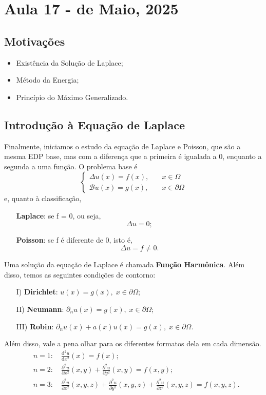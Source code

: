 \documentclass[../pde_notes.tex]{subfiles}
\begin{document}
\section{Aula 17 - de Maio, 2025}
\subsection{Motivações}
\begin{itemize}
	\item Existência da Solução de Laplace;
	\item Método da Energia;
	\item Princípio do Máximo Generalizado.
\end{itemize}
\subsection{Introdução à Equação de Laplace}
Finalmente, iniciamos o estudo da equação de Laplace e Poisson, que são a mesma EDP base, mas com a diferença que a primeira é igualada a 0, enquanto a segunda a uma função. O problema base é
\[
	\left\{\begin{array}{ll}
		\Delta u(x) = f(x),     & \quad x\in \Omega          \\
		\mathcal{B}u(x) = g(x), & \quad x\in \partial \Omega
	\end{array}\right.
\]
e, quanto à classificação,
\begin{itemize}
	\item[\textbf{Laplace}:] se f = 0, ou seja,
	      \[
		      \Delta u = 0;
	      \]
	\item[\textbf{Poisson}:] se f é diferente de 0, isto é,
	      \[
		      \Delta u = f\neq 0.
	      \]
\end{itemize}
Uma solução da equação de Laplace é chamada \textbf{Função Harmônica}. Além disso, temos as seguintes condições de contorno:
\begin{itemize}
	\item[I)] \textbf{Dirichlet}: \(u(x) = g(x),\; x\in \partial \Omega \);
	\item[II)] \textbf{Neumann}: \(\partial_{n}u(x) = g(x), \; x\in \partial \Omega \);
	\item[III)] \textbf{Robin}: \(\partial_{n}u(x) + a(x)u(x) = g(x), \; x\in \partial \Omega \).
\end{itemize}
Além disso, vale a pena olhar para os diferentes formatos dela em cada dimensão.
\begin{align*}
	 & n=1:\quad \frac{\mathrm{d}^{2}u}{\mathrm{d}x^{2}}(x) = f(x);                                                                                                          \\
	 & n=2:\quad \frac{\partial^{2}u}{\partial x^{2}}(x,y) + \frac{\partial^{2}u}{\partial y^{2}}(x,y) = f(x,y);                                                             \\
	 & n=3:\quad \frac{\partial^{2}u}{\partial x^{2}}(x, y, z) + \frac{\partial^{2}u}{\partial y^{2}}(x, y, z) + \frac{\partial^{2}u}{\partial z^{2}}(x, y, z) = f(x, y, z).
\end{align*}
\end{document}
